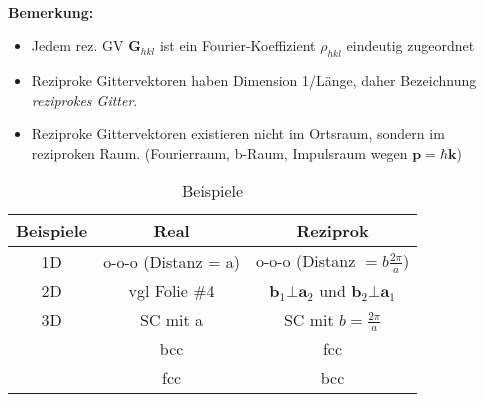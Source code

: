 \begin{itemize}
\begin{itemize}
\begin{align*}
                \end{align*}
          \end{itemize}
          \textbf{Bemerkung:}
          \begin{itemize}
              \item Jedem rez. GV $\textbf{G}_{hkl}$ ist ein Fourier-Koeffizient $\rho_{hkl}$ eindeutig zugeordnet
              \item Reziproke Gittervektoren haben Dimension 1/Länge, daher Bezeichnung \textit{reziprokes Gitter}.
              \item Reziproke Gittervektoren existieren nicht im Ortsraum, sondern im reziproken Raum. (Fourierraum, b-Raum,  Impulsraum wegen $\textbf{p}= \hbar \textbf{k}$)
          \end{itemize}
          \begin{table}[htbp]
              \centering
              \caption{Beispiele}
              \begin{tabular}{ccc}
                  \hline
                  Beispiele & Real                & Reziprok                                                            \\ \hline
                  1D        & o-o-o (Distanz = a) & o-o-o  (Distanz $= b \frac{2\pi}{a}$)                                 \\
                  2D        & vgl Folie \#4       & $\textbf{b}_1 \bot \textbf{a}_2$ und $\textbf{b}_2 \bot \textbf{a}_1$ \\
                  3D        & SC mit a            & SC mit $b=\frac{2\pi}{a}$                                             \\
                            & bcc                 & fcc                                                                   \\
                            & fcc                 & bcc                                                                   \\ \hline
              \end{tabular}
          \end{table}


\end{itemize}

